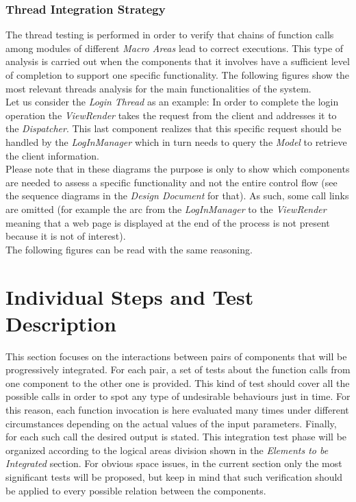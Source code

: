 \documentclass[11pt,a4paper]{report}
\begin{document}
\subsection{Thread Integration Strategy}
The thread testing is performed in order to verify that chains of function calls among modules of different \textit{Macro Areas} lead to correct executions. This type of analysis is carried out when the components that it involves have a sufficient level of completion to support one specific functionality. The following figures show the most relevant threads analysis for the main functionalities of the system.\\Let us consider the \textit{Login Thread} as an example:
\noindent In order to complete the login operation the \textit{ViewRender} takes the request from the client and addresses it to the \textit{Dispatcher}. This last component realizes that this specific request should be handled by the \textit{LogInManager} which in turn needs to query the \textit{Model} to retrieve the client information.\\Please note that in these diagrams the purpose is only to show which components are needed to assess a specific functionality and not the entire control flow (see the sequence diagrams in the \textit{Design Document} for that). As such, some call links are omitted (for example the arc from the \textit{LogInManager} to the \textit{ViewRender} meaning that a web page is displayed at the end of the process is not present because it is not of interest).\\The following figures can be read with the same reasoning.

\chapter[Individual Steps and Test Description]{Individual Steps and Test \\Description}
This section focuses on the interactions between pairs of components that will be progressively integrated. For each pair, a set of tests about the  function calls from one component to the other one is provided. This kind of test should cover all the possible calls in order to spot any type of undesirable behaviours just in time. For this reason, each function invocation is here evaluated many times under different circumstances depending on the actual values of the input parameters. Finally, for each such call the desired output is stated.
This integration test phase will be organized according to the logical areas division shown in the \textit{Elements to be Integrated} section.
For obvious space issues, in the current section only the most significant tests will be proposed, but keep in mind that such verification should be applied to every possible relation between the components.
\end{document}
